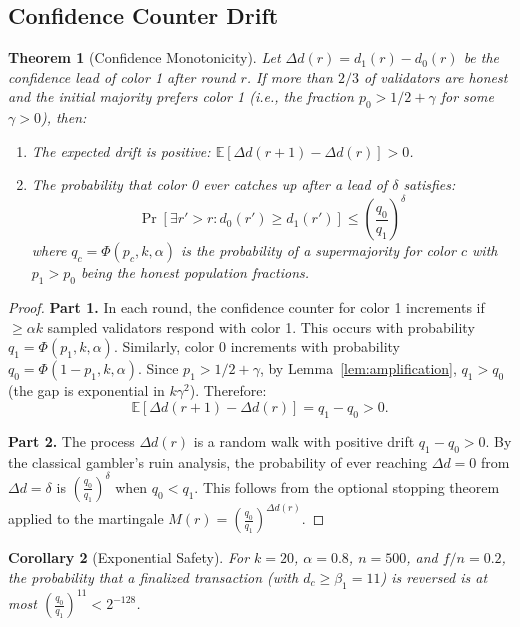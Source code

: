 \documentclass[11pt,a4paper]{article}
\newtheorem{theorem}{Theorem}[section]
\newtheorem{corollary}[theorem]{Corollary}
\begin{document}
\subsection{Confidence Counter Drift}

\begin{theorem}[Confidence Monotonicity]
\label{thm:monotonicity}
Let $\Delta d(r) = d_1(r) - d_0(r)$ be the confidence lead of color 1 after round $r$.
If more than $2/3$ of validators are honest and the initial majority prefers color 1
(i.e., the fraction $p_0 > 1/2 + \gamma$ for some $\gamma > 0$), then:
\begin{enumerate}[nosep]
\item The expected drift is positive: $\mathbb{E}[\Delta d(r+1) - \Delta d(r)] > 0$.
\item The probability that color 0 ever catches up after a lead of $\delta$ satisfies:
\[
\Pr[\exists r' > r : d_0(r') \geq d_1(r')] \leq \left(\frac{q_0}{q_1}\right)^\delta
\]
where $q_c = \Phi(p_c, k, \alpha)$ is the probability of a supermajority for color $c$
with $p_1 > p_0$ being the honest population fractions.
\end{enumerate}
\end{theorem}

\begin{proof}
\textbf{Part 1.} In each round, the confidence counter for color 1 increments if
$\geq \alpha k$ sampled validators respond with color 1. This occurs with probability
$q_1 = \Phi(p_1, k, \alpha)$. Similarly, color 0 increments with probability
$q_0 = \Phi(1 - p_1, k, \alpha)$. Since $p_1 > 1/2 + \gamma$, by Lemma~\ref{lem:amplification},
$q_1 > q_0$ (the gap is exponential in $k\gamma^2$). Therefore:
\[
\mathbb{E}[\Delta d(r+1) - \Delta d(r)] = q_1 - q_0 > 0.
\]

\textbf{Part 2.} The process $\Delta d(r)$ is a random walk with positive drift $q_1 - q_0 > 0$.
By the classical gambler's ruin analysis, the probability of ever reaching $\Delta d = 0$
from $\Delta d = \delta$ is $\left(\frac{q_0}{q_1}\right)^\delta$ when $q_0 < q_1$.
This follows from the optional stopping theorem applied to the martingale
$M(r) = \left(\frac{q_0}{q_1}\right)^{\Delta d(r)}$.
\end{proof}

\begin{corollary}[Exponential Safety]
\label{cor:safety}
For $k = 20$, $\alpha = 0.8$, $n = 500$, and $f/n = 0.2$, the probability that a
finalized transaction (with $d_c \geq \beta_1 = 11$) is reversed is at most
$\left(\frac{q_0}{q_1}\right)^{11} < 2^{-128}$.
\end{corollary}
\end{document}

